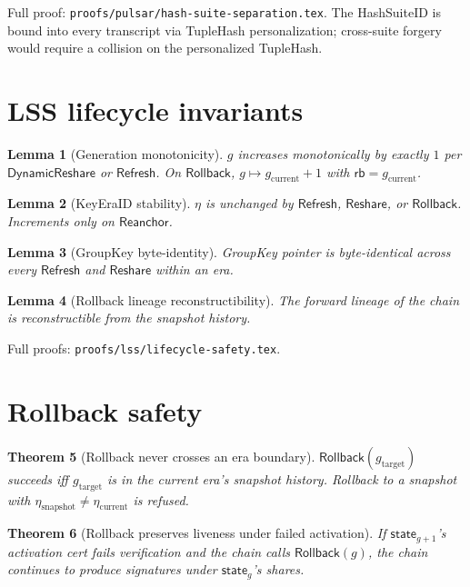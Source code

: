 \documentclass[11pt,a4paper]{article}
\newtheorem{theorem}{Theorem}
\newtheorem{lemma}[theorem]{Lemma}
\begin{document}
Full proof: \texttt{proofs/pulsar/hash-suite-separation.tex}. The HashSuiteID is bound into every transcript via TupleHash personalization; cross-suite forgery would require a collision on the personalized TupleHash.

\section{LSS lifecycle invariants}

\begin{lemma}[Generation monotonicity]
$g$ increases monotonically by exactly $1$ per $\mathsf{DynamicReshare}$ or $\mathsf{Refresh}$. On $\mathsf{Rollback}$, $g \mapsto g_{\mathrm{current}} + 1$ with $\mathsf{rb} = g_{\mathrm{current}}$.
\end{lemma}

\begin{lemma}[KeyEraID stability]
$\eta$ is unchanged by $\mathsf{Refresh}$, $\mathsf{Reshare}$, or $\mathsf{Rollback}$. Increments only on $\mathsf{Reanchor}$.
\end{lemma}

\begin{lemma}[GroupKey byte-identity]
GroupKey pointer is byte-identical across every $\mathsf{Refresh}$ and $\mathsf{Reshare}$ within an era.
\end{lemma}

\begin{lemma}[Rollback lineage reconstructibility]
The forward lineage of the chain is reconstructible from the snapshot history.
\end{lemma}

Full proofs: \texttt{proofs/lss/lifecycle-safety.tex}.

\section{Rollback safety}

\begin{theorem}[Rollback never crosses an era boundary]
$\mathsf{Rollback}(g_{\mathrm{target}})$ succeeds iff $g_{\mathrm{target}}$ is in the current era's snapshot history. Rollback to a snapshot with $\eta_{\mathrm{snapshot}} \neq \eta_{\mathrm{current}}$ is refused.
\end{theorem}

\begin{theorem}[Rollback preserves liveness under failed activation]
If $\mathsf{state}_{g+1}$'s activation cert fails verification and the chain calls $\mathsf{Rollback}(g)$, the chain continues to produce signatures under $\mathsf{state}_g$'s shares.
\end{theorem}
\end{document}
